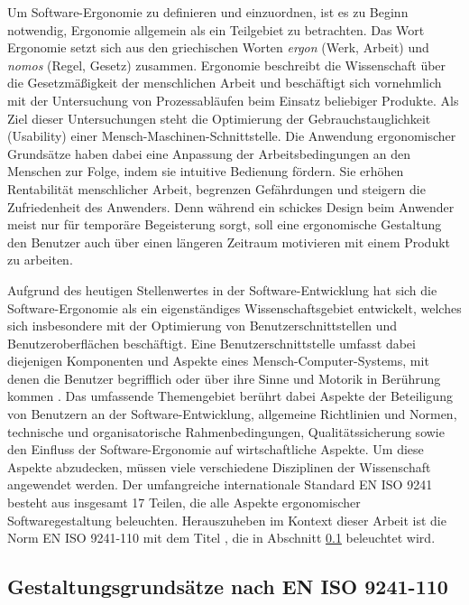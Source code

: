 Um Software-Ergonomie zu definieren und einzuordnen, ist es zu Beginn notwendig, Ergonomie allgemein als ein Teilgebiet zu betrachten. Das Wort Ergonomie setzt sich aus den griechischen Worten \emph{ergon} (Werk, Arbeit) und \emph{nomos} (Regel, Gesetz) zusammen. Ergonomie beschreibt die Wissenschaft über die Gesetzmäßigkeit der menschlichen Arbeit und beschäftigt sich vornehmlich mit der Untersuchung von Prozessabläufen beim Einsatz beliebiger Produkte. Als Ziel dieser Untersuchungen steht die Optimierung der Gebrauchstauglichkeit (Usability) einer Mensch-Maschinen-Schnittstelle. Die Anwendung ergonomischer Grundsätze haben dabei eine Anpassung der Arbeitsbedingungen an den Menschen zur Folge, indem sie intuitive Bedienung fördern. Sie erhöhen Rentabilität menschlicher Arbeit, begrenzen Gefährdungen und steigern die Zufriedenheit des Anwenders. \parencite[vgl.][1\psq]{Wandmacher1993} Denn während ein schickes Design beim Anwender meist nur für temporäre Begeisterung sorgt, soll eine ergonomische Gestaltung den Benutzer auch über einen längeren Zeitraum motivieren mit einem Produkt zu arbeiten. 

Aufgrund des heutigen Stellenwertes in der Software-Entwicklung hat sich die Software-Ergonomie als ein eigenständiges Wissenschaftsgebiet entwickelt, welches sich insbesondere mit der Optimierung von Benutzerschnittstellen und Benutzeroberflächen beschäftigt. Eine Benutzerschnittstelle umfasst dabei diejenigen Komponenten und Aspekte eines Mensch-Computer-Systems, mit denen die Benutzer begrifflich oder über ihre Sinne und Motorik in Berührung kommen \parencite[vgl.][3\psqq]{Moran1981}. Das umfassende Themengebiet berührt dabei Aspekte der Beteiligung von Benutzern an der Software-Entwicklung, allgemeine Richtlinien und Normen, technische und organisatorische Rahmenbedingungen, Qualitätssicherung sowie den Einfluss der Software-Ergonomie auf wirtschaftliche Aspekte. Um diese Aspekte abzudecken, müssen viele verschiedene Disziplinen der Wissenschaft angewendet werden. Der umfangreiche internationale Standard EN ISO 9241 besteht aus insgesamt 17 Teilen, die alle Aspekte ergonomischer Softwaregestaltung beleuchten. Herauszuheben im Kontext dieser Arbeit ist die Norm EN ISO 9241-110 mit dem Titel , die in Abschnitt \ref{sec:ERG:Gestaltungsgrundsätze nach EN ISO 9241-110} beleuchtet wird.

\subsection{Gestaltungsgrundsätze nach EN ISO 9241-110}
\label{sec:ERG:Gestaltungsgrundsätze nach EN ISO 9241-110}

